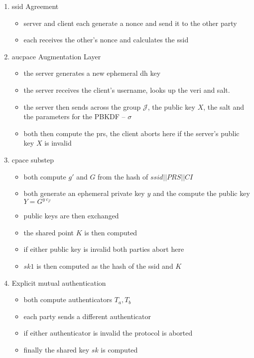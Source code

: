 \begin{enumerate}
  \item{
    \gls{ssid} Agreement
    \begin{itemize}
      \item{server and client each generate a \gls{nonce} and send it to the other party}
      \item{each receives the other's \gls{nonce} and calculates the \gls{ssid}}
    \end{itemize}
  }
  \item{
    \gls{aucpace} Augmentation Layer
    \begin{itemize}
      \item{the server generates a new ephemeral \gls{dh} key}
      \item{the server receives the client's username, looks up the \gls{veri} and salt.}
      \item{the server then sends across the group $\mathcal{J}$, the public key $X$, the salt and the parameters for the PBKDF -- $\sigma$}
      \item{both then compute the \gls{prs}, the client aborts here if the server's public key $X$ is invalid}
    \end{itemize}
  }
  \item{
    \gls{cpace} substep
    \begin{itemize}
      \item{both compute $g'$ and $G$ from the hash of $ssid||PRS||CI$}
      \item{both generate an ephemeral private key $y$ and the compute the public key $Y = G^{y\ c_{\mathcal{J}}}$}
      \item{public keys are then exchanged}
      \item{the shared point $K$ is then computed}
      \item{if either public key is invalid both parties abort here}
      \item{$sk1$ is then computed as the hash of the \gls{ssid} and $K$}
    \end{itemize}
  }
  \item{
    Explicit mutual authentication
    \begin{itemize}
      \item{both compute authenticators $T_a, T_b$}
      \item{each party sends a different authenticator}
      \item{if either authenticator is invalid the protocol is aborted}
      \item{finally the shared key $sk$ is computed}
    \end{itemize}
  }
\end{enumerate}

